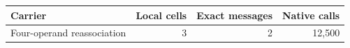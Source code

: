 \begin{tabular}{lrrr}
\toprule
Carrier & Local cells & Exact messages & Native calls \\
\midrule
Four-operand reassociation & 3 & 2 & 12,500 \\
\bottomrule
\end{tabular}

